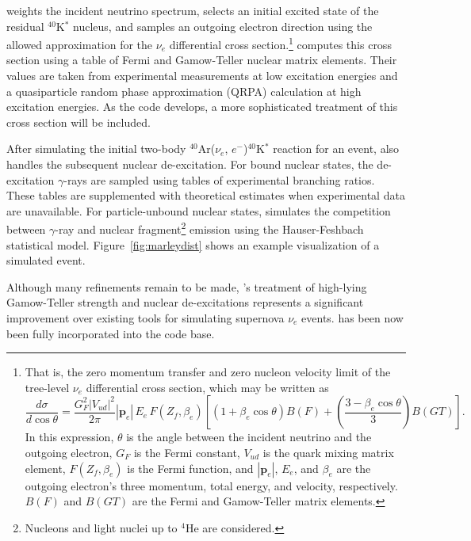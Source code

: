  weights the incident neutrino spectrum, selects an initial excited state
of the residual $^{40}$K$^*$ nucleus, and samples an outgoing electron
direction using the allowed approximation for the $\nu_e$  differential cross
section.\footnote{That is, the zero momentum transfer and zero nucleon velocity
limit of the tree-level $\nu_e$  differential cross section, which may be
written as
\[
\frac{d\sigma}{d\cos \theta}
= \frac{G_F^2 |V_{ud}|^2}{2\pi} |\mathbf{p}_e|\, E_e \,F(Z_f, \beta_e)
\left[(1+\beta_e \cos\theta)B(F) + \left(\frac{3 - \beta_e \cos\theta}
{3}\right)B(GT)\right].
\]
In this expression, $\theta$ is the angle between the incident neutrino and the
outgoing electron, $G_F$ is the Fermi constant, $V_{ud}$ is the quark mixing
matrix element, $F(Z_f, \beta_e)$ is the Fermi function, and $|\mathbf{p}_e|$,
$E_e$, and $\beta_e$ are the outgoing electron's three momentum, total energy,
and velocity, respectively. $B(F)$ and $B(GT)$ are the Fermi and Gamow-Teller
matrix elements.
}
 computes this cross section using a table of Fermi and Gamow-Teller
nuclear matrix elements. Their values are taken from experimental measurements
at low excitation energies and a quasiparticle random phase approximation
(QRPA) calculation at high excitation energies. As the code develops, a more
sophisticated treatment of this cross section will  be included.

After simulating the initial two-body $^{40}${Ar}($\nu_e$,
$e^{-}$)$^{40}$K$^*$ reaction for an event, 
also handles the subsequent nuclear de-excitation. For bound nuclear
states, the de-excitation $\gamma$-rays are sampled using tables of
experimental branching ratios. These tables are supplemented with
theoretical estimates when experimental data are unavailable. For
particle-unbound nuclear states,  simulates the competition between
$\gamma$-ray and nuclear fragment\footnote{ Nucleons and light nuclei up to
$^{4}${He} are considered.} emission using the Hauser-Feshbach
statistical model.   Figure~\ref{fig:marleydist} shows an example
visualization of a simulated  event.

Although many refinements remain to be made, 's treatment of high-lying
Gamow-Teller strength and nuclear de-excitations represents a significant
improvement over existing tools for simulating supernova $\nu_e$  events.   has been now been fully incorporated into the  code base.



